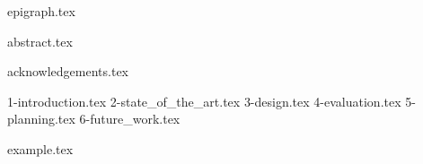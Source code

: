 \documentclass{uc3mthesisIEEE}
\begin{document}

  \maketitle
  \blankpage

  {epigraph.tex}

  \pagestyle{noheader}

  {abstract.tex}

  {acknowledgements.tex}

  \tableofcontents

  \listoffigures

  \listoftables


  \clearpage
  \pagestyle{fancy}

  {1-introduction.tex}
  {2-state_of_the_art.tex}
  {3-design.tex}
  {4-evaluation.tex}
  {5-planning.tex}
  {6-future_work.tex}

  \newpage
  {example.tex}


  \clearpage
  \printbibliography


  \startappendix

\end{document}
